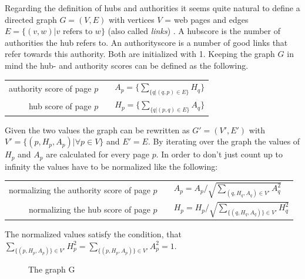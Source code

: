 Regarding the definition of hubs and authorities it seems quite natural to define a directed graph $G=(V,E)$ with vertices $V$ = web pages and edges $E = \{(v,w) | v \textrm{ refers to }w\}$ (also called \emph{links}) .
A hubscore is the number of authorities the hub refers to. An authorityscore is a number of good links that refer towards this authority. Both are initialized with 1.
Keeping the graph $G$ in mind the hub- and authority scores can be defined as the following. \newline
\begin{center}
  \begin{tabular}{ r c l }
    authority score of page $p$ & & $A_p=\{ \sum\nolimits_{\{ q | (q,p) \in E \} } H_q \}$ \\
    hub score of page $p$ & & $H_p = \{ \sum\nolimits_{\{ q | (p,q) \in E \} } A_q \}$ \\
  \end{tabular}
\end{center}
Given the two values the graph can be rewritten as $G'=(V',E')$ with $V'=\{ (p, H_p, A_p)| \forall p\in V\}$ and $E' = E$.
By iterating over the graph the values of $H_p$ and $A_p$ are calculated for every page $p$.  In order to don't just count up to infinity the values have to be normalized like the following:
\begin{center}
  \begin{tabular}{ r c l }
    normalizing the authority score of page $p$ & & $A_p= A_p/\sqrt{\sum\nolimits_{ (q,H_q,A_q) \in V' } A_q^2}$ \\
    normalizing the hub score of page $p$ & & $H_p = H_p/\sqrt{\sum\nolimits_{\{(q,H_q,A_q) \} \in V'} H_q^2}$ \\
  \end{tabular}
\end{center}
The normalized values satisfy the condition, that $\sum\nolimits_{\{(p,H_p,A_p) \} \in V'} H_p^2 = \sum\nolimits_{\{(p,H_p,A_p) \} \in V'} A_p^2 = 1$.

\begin{figure}
  \centering
  \caption{The graph G}
  \label{hits_graph_g}
\end{figure}

